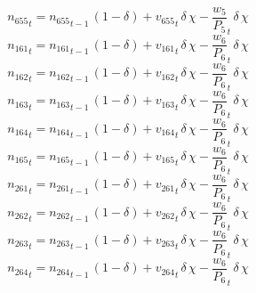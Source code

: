 \begin{dmath}
{{n_{655}}}_{t}={{n_{655}}}_{t-1}\, \left(1-{{\delta}}\right)+{{v_{655}}}_{t}\, {{\delta}}\, {{\chi}}-{{\frac{w_{5}}{P_{5}}}}_{t}\, {{\delta}}\, {{\chi}}
\end{dmath}
\begin{dmath}
{{n_{161}}}_{t}={{n_{161}}}_{t-1}\, \left(1-{{\delta}}\right)+{{v_{161}}}_{t}\, {{\delta}}\, {{\chi}}-{{\frac{w_{6}}{P_{6}}}}_{t}\, {{\delta}}\, {{\chi}}
\end{dmath}
\begin{dmath}
{{n_{162}}}_{t}={{n_{162}}}_{t-1}\, \left(1-{{\delta}}\right)+{{v_{162}}}_{t}\, {{\delta}}\, {{\chi}}-{{\frac{w_{6}}{P_{6}}}}_{t}\, {{\delta}}\, {{\chi}}
\end{dmath}
\begin{dmath}
{{n_{163}}}_{t}={{n_{163}}}_{t-1}\, \left(1-{{\delta}}\right)+{{v_{163}}}_{t}\, {{\delta}}\, {{\chi}}-{{\frac{w_{6}}{P_{6}}}}_{t}\, {{\delta}}\, {{\chi}}
\end{dmath}
\begin{dmath}
{{n_{164}}}_{t}={{n_{164}}}_{t-1}\, \left(1-{{\delta}}\right)+{{v_{164}}}_{t}\, {{\delta}}\, {{\chi}}-{{\frac{w_{6}}{P_{6}}}}_{t}\, {{\delta}}\, {{\chi}}
\end{dmath}
\begin{dmath}
{{n_{165}}}_{t}={{n_{165}}}_{t-1}\, \left(1-{{\delta}}\right)+{{v_{165}}}_{t}\, {{\delta}}\, {{\chi}}-{{\frac{w_{6}}{P_{6}}}}_{t}\, {{\delta}}\, {{\chi}}
\end{dmath}
\begin{dmath}
{{n_{261}}}_{t}={{n_{261}}}_{t-1}\, \left(1-{{\delta}}\right)+{{v_{261}}}_{t}\, {{\delta}}\, {{\chi}}-{{\frac{w_{6}}{P_{6}}}}_{t}\, {{\delta}}\, {{\chi}}
\end{dmath}
\begin{dmath}
{{n_{262}}}_{t}={{n_{262}}}_{t-1}\, \left(1-{{\delta}}\right)+{{v_{262}}}_{t}\, {{\delta}}\, {{\chi}}-{{\frac{w_{6}}{P_{6}}}}_{t}\, {{\delta}}\, {{\chi}}
\end{dmath}
\begin{dmath}
{{n_{263}}}_{t}={{n_{263}}}_{t-1}\, \left(1-{{\delta}}\right)+{{v_{263}}}_{t}\, {{\delta}}\, {{\chi}}-{{\frac{w_{6}}{P_{6}}}}_{t}\, {{\delta}}\, {{\chi}}
\end{dmath}
\begin{dmath}
{{n_{264}}}_{t}={{n_{264}}}_{t-1}\, \left(1-{{\delta}}\right)+{{v_{264}}}_{t}\, {{\delta}}\, {{\chi}}-{{\frac{w_{6}}{P_{6}}}}_{t}\, {{\delta}}\, {{\chi}}
\end{dmath}
